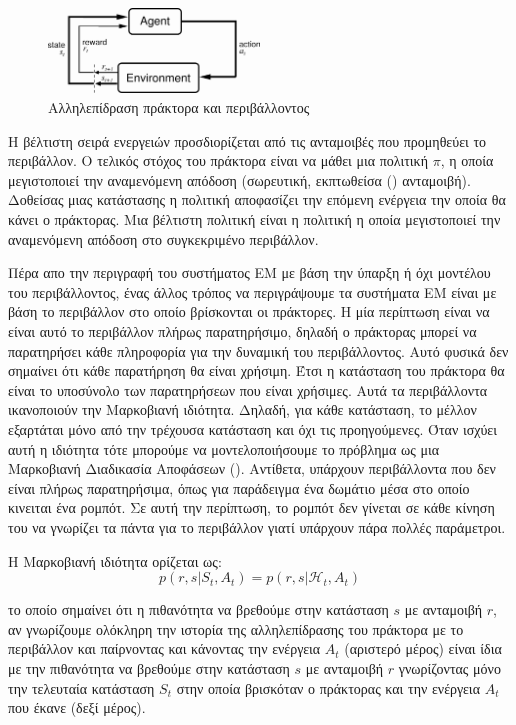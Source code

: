 \begin{figure}[ht]
    \includegraphics[width=0.5\textwidth]{body_matter/reinforcement_learning/images/agent_environment.png}
    \Centering
    \caption{Αλληλεπίδραση πράκτορα και περιβάλλοντος}
    \label{fig:agent_environment}
\end{figure}


Η βέλτιστη σειρά ενεργειών προσδιορίζεται από τις ανταμοιβές που προμηθεύει το περιβάλλον. Ο τελικός στόχος του πράκτορα είναι να μάθει μια
πολιτική $π$, η οποία μεγιστοποιεί την αναμενόμενη απόδοση (σωρευτική, εκπτωθείσα () ανταμοιβή). Δοθείσας μιας κατάστασης
η πολιτική αποφασίζει την επόμενη ενέργεια την οποία θα κάνει ο πράκτορας. Μια βέλτιστη πολιτική είναι η πολιτική η οποία μεγιστοποιεί
την αναμενόμενη απόδοση στο συγκεκριμένο περιβάλλον.

Πέρα απο την περιγραφή του συστήματος ΕΜ με βάση την ύπαρξη ή όχι μοντέλου του περιβάλλοντος, ένας
άλλος τρόπος να περιγράψουμε τα συστήματα ΕΜ είναι με βάση το περιβάλλον στο οποίο βρίσκονται οι πράκτορες. Η μία περίπτωση είναι να είναι αυτό το περιβάλλον πλήρως παρατηρήσιμο, δηλαδή ο πράκτορας μπορεί να παρατηρήσει κάθε πληροφορία για την δυναμική του περιβάλλοντος.
Αυτό φυσικά δεν σημαίνει ότι κάθε παρατήρηση θα είναι χρήσιμη. Έτσι η κατάσταση
του πράκτορα θα είναι το υποσύνολο των παρατηρήσεων που είναι χρήσιμες. Αυτά τα
περιβάλλοντα ικανοποιούν την Μαρκοβιανή ιδιότητα. Δηλαδή, για κάθε κατάσταση, το μέλλον εξαρτάται μόνο από
την τρέχουσα κατάσταση και όχι τις προηγούμενες. Όταν ισχύει αυτή η ιδιότητα τότε μπορούμε να μοντελοποιήσουμε το πρόβλημα ως μια
Μαρκοβιανή Διαδικασία Αποφάσεων (). Αντίθετα, υπάρχουν περιβάλλοντα που δεν είναι πλήρως
παρατηρήσιμα, όπως για παράδειγμα ένα δωμάτιο μέσα στο οποίο κινειται ένα ρομπότ. Σε αυτή την περίπτωση,
το ρομπότ δεν γίνεται σε κάθε κίνηση του να γνωρίζει τα πάντα για το περιβάλλον γιατί υπάρχουν πάρα πολλές παράμετροι.

Η Μαρκοβιανή ιδιότητα ορίζεται ως:
\begin{equation}
    p(r,s|S_t, A_t) = p(r,s | \mathcal{H}_t, A_t)
\end{equation}

το οποίο σημαίνει ότι η πιθανότητα να βρεθούμε στην κατάσταση $s$ με ανταμοιβή $r$, αν γνωρίζουμε
ολόκληρη την ιστορία της αλληλεπίδρασης του πράκτορα με το περιβάλλον και παίρνοντας και κάνοντας
την ενέργεια $A_t$ (αριστερό μέρος) είναι ίδια με την πιθανότητα να βρεθούμε στην κατάσταση $s$ με
ανταμοιβή $r$ γνωρίζοντας μόνο την τελευταία κατάσταση $S_t$ στην οποία βρισκόταν ο πράκτορας
και την ενέργεια $A_t$ που έκανε (δεξί μέρος).

